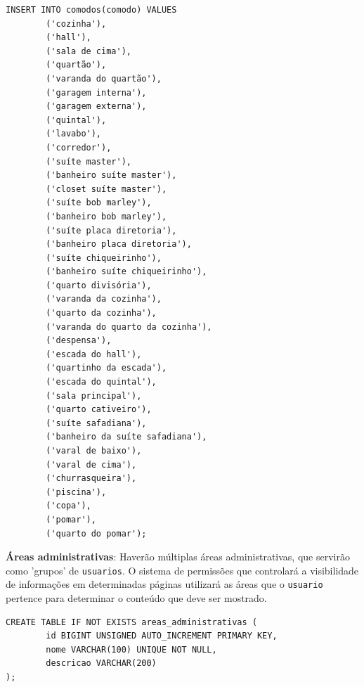 \documentclass[11pt]{article}
\begin{document}
\begin{enumerate}
\begin{enumerate}
\begin{verbatim}
INSERT INTO comodos(comodo) VALUES
        ('cozinha'),
        ('hall'),
        ('sala de cima'),
        ('quartão'),
        ('varanda do quartão'),
        ('garagem interna'),
        ('garagem externa'),
        ('quintal'),
        ('lavabo'),
        ('corredor'),
        ('suíte master'),
        ('banheiro suíte master'),
        ('closet suíte master'),
        ('suíte bob marley'),
        ('banheiro bob marley'),
        ('suíte placa diretoria'),
        ('banheiro placa diretoria'),
        ('suíte chiqueirinho'),
        ('banheiro suíte chiqueirinho'),
        ('quarto divisória'),
        ('varanda da cozinha'),
        ('quarto da cozinha'),
        ('varanda do quarto da cozinha'),
        ('despensa'),
        ('escada do hall'),
        ('quartinho da escada'),
        ('escada do quintal'),
        ('sala principal'),
        ('quarto cativeiro'),
        ('suíte safadiana'),
        ('banheiro da suíte safadiana'),
        ('varal de baixo'),
        ('varal de cima'),
        ('churrasqueira'),
        ('piscina'),
        ('copa'),
        ('pomar'),
        ('quarto do pomar');
\end{verbatim}
\textbf{Áreas administrativas}:
Haverão múltiplas áreas administrativas, que servirão como 'grupos' de \texttt{usuarios}. O sistema de permissões que controlará a visibilidade de informações em determinadas páginas utilizará as áreas que o \texttt{usuario} pertence para determinar o conteúdo que deve ser mostrado.
\begin{verbatim}
CREATE TABLE IF NOT EXISTS areas_administrativas (
        id BIGINT UNSIGNED AUTO_INCREMENT PRIMARY KEY,
        nome VARCHAR(100) UNIQUE NOT NULL,
        descricao VARCHAR(200)
);


\end{verbatim}
\end{enumerate}
\end{enumerate}
\end{document}
